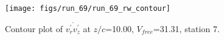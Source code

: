 \begin{figure}[H]
\centering
\texttt{[image: figs/run\_69/run\_69\_rw\_contour]}
\caption{Contour plot of $\overline{v_{r}^{\prime} v_{z}^{\prime}}$ at $z/c$=10.00, $V_{free}$=31.31, station 7.}
\label{fig:run_69_rw_contour}
\end{figure}


